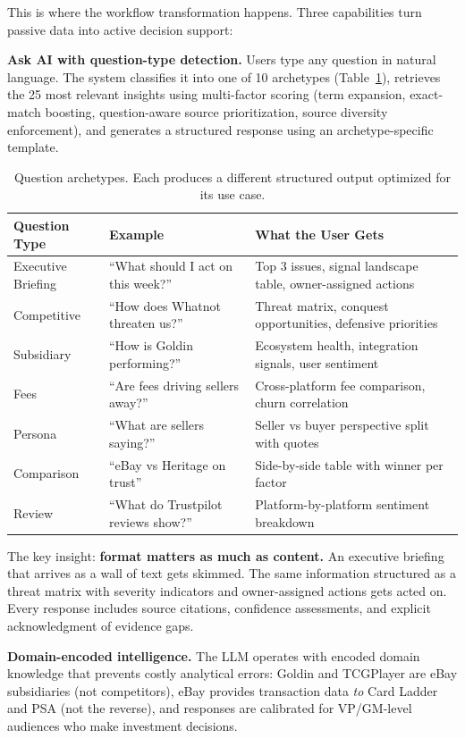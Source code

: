 \documentclass[11pt]{article}
\begin{document}
This is where the workflow transformation happens. Three capabilities turn passive data into active decision support:

\textbf{Ask AI with question-type detection.} Users type any question in natural language. The system classifies it into one of 10 archetypes (Table~\ref{tab:qtypes}), retrieves the 25 most relevant insights using multi-factor scoring (term expansion, exact-match boosting, question-aware source prioritization, source diversity enforcement), and generates a structured response using an archetype-specific template.

\begin{table}[H]
\centering
\small
\begin{tabular}{@{}llp{4.2cm}@{}}
\toprule
\textbf{Question Type} & \textbf{Example} & \textbf{What the User Gets} \\
\midrule
Executive Briefing & ``What should I act on this week?'' & Top 3 issues, signal landscape table, owner-assigned actions \\
Competitive & ``How does Whatnot threaten us?'' & Threat matrix, conquest opportunities, defensive priorities \\
Subsidiary & ``How is Goldin performing?'' & Ecosystem health, integration signals, user sentiment \\
Fees & ``Are fees driving sellers away?'' & Cross-platform fee comparison, churn correlation \\
Persona & ``What are sellers saying?'' & Seller vs buyer perspective split with quotes \\
Comparison & ``eBay vs Heritage on trust'' & Side-by-side table with winner per factor \\
Review & ``What do Trustpilot reviews show?'' & Platform-by-platform sentiment breakdown \\
\bottomrule
\end{tabular}
\caption{Question archetypes. Each produces a different structured output optimized for its use case.}
\label{tab:qtypes}
\end{table}

The key insight: \textbf{format matters as much as content.} An executive briefing that arrives as a wall of text gets skimmed. The same information structured as a threat matrix with severity indicators and owner-assigned actions gets acted on. Every response includes source citations, confidence assessments, and explicit acknowledgment of evidence gaps.

\textbf{Domain-encoded intelligence.} The LLM operates with encoded domain knowledge that prevents costly analytical errors: Goldin and TCGPlayer are eBay subsidiaries (not competitors), eBay provides transaction data \textit{to} Card Ladder and PSA (not the reverse), and responses are calibrated for VP/GM-level audiences who make investment decisions.
\end{document}
